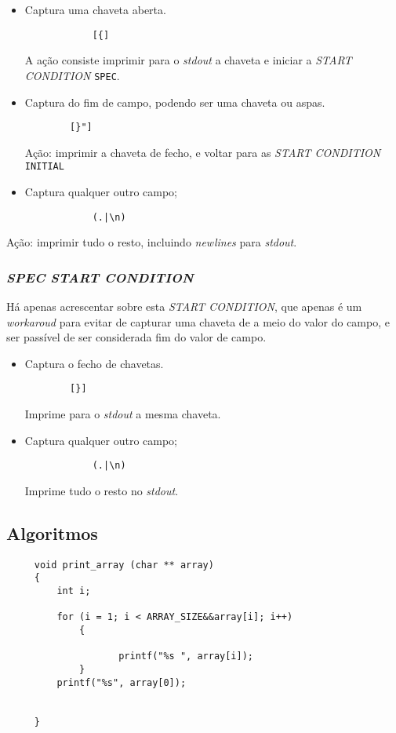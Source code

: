 \begin{itemize}
  \item Captura uma chaveta aberta.
    \begin{verbatim}
			[{]
    \end{verbatim}
		A ação consiste imprimir para o \emph{stdout} a chaveta e iniciar
		a \emph{START CONDITION} \texttt{SPEC}.

  \item Captura do fim de campo, podendo ser uma chaveta ou aspas.
    \begin{verbatim}
		[}"]
    \end{verbatim}
		Ação: imprimir a chaveta de fecho, e voltar para as \emph{START CONDITION}
		\texttt{INITIAL}

  \item Captura qualquer outro campo;
    \begin{verbatim}
			(.|\n)
    \end{verbatim}
\end{itemize}
Ação: imprimir tudo o resto, incluindo \emph{newlines} para \emph{stdout}.



\subsubsection{\emph{SPEC \emph{START CONDITION}}}

Há apenas acrescentar sobre esta \emph{START CONDITION}, que apenas é um
\emph{workaroud} para evitar de capturar uma chaveta de a meio do valor do
campo, e ser passível de ser considerada fim do valor de campo. 


\begin{itemize}
  \item Captura o fecho de chavetas.
    \begin{verbatim}
		[}]
    \end{verbatim}
		Imprime para o \emph{stdout} a mesma chaveta.


  \item Captura qualquer outro campo;
    \begin{verbatim}
			(.|\n)
    \end{verbatim}
		Imprime tudo o resto no \emph{stdout}.
	
\end{itemize}
\subsection{Algoritmos}
\label{subsec:des:algol}
\begin{Verbatim}
     void print_array (char ** array)
     {
         int i;
     	
         for (i = 1; i < ARRAY_SIZE&&array[i]; i++)
             {
     						
     	            printf("%s ", array[i]);
             }
         printf("%s", array[0]);
     										
     															
     }

\end{Verbatim}

